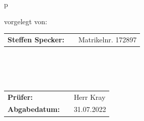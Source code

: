 \begin{titlepage}
\begin{center}
\begin{tabular}{p{\textwidth}}
\\

\begin{center}
vorgelegt von: 
\end{center}

\begin{center}
    \begin{tabular}{lll}
        \textbf{Steffen Specker:} & & Matrikelnr. 172897\\
        \end{tabular} 
\end{center}

\\

\\

\\

\begin{center}
\begin{tabular}{lll}
\textbf{Prüfer:} & & Herr Kray\\
\textbf{Abgabedatum:} & & 31.07.2022\\
\end{tabular}
\end{center}

\end{tabular}
\end{center}

\end{titlepage}